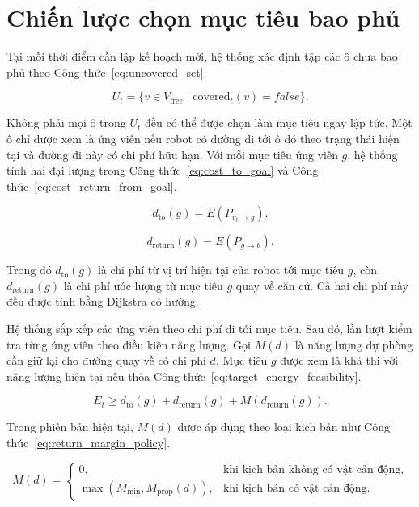 \documentclass[../DoAn.tex]{subfiles}
\begin{document}
\section{Chiến lược chọn mục tiêu bao phủ}

Tại mỗi thời điểm cần lập kế hoạch mới, hệ thống xác định tập các ô chưa bao phủ theo Công thức~\ref{eq:uncovered_set}.

\begin{equation}
    U_t=\{v\in V_{\text{free}} \mid \text{covered}_t(v)=false\}.
    \label{eq:uncovered_set}
\end{equation}

Không phải mọi ô trong $U_t$ đều có thể được chọn làm mục tiêu ngay lập tức. Một ô chỉ được xem là ứng viên nếu robot có đường đi tới ô đó theo trạng thái hiện tại và đường đi này có chi phí hữu hạn. Với mỗi mục tiêu ứng viên $g$, hệ thống tính hai đại lượng trong Công thức~\ref{eq:cost_to_goal} và Công thức~\ref{eq:cost_return_from_goal}.

\begin{equation}
    d_{\text{to}}(g)=E(P_{v_t\rightarrow g}).
    \label{eq:cost_to_goal}
\end{equation}

\begin{equation}
    d_{\text{return}}(g)=E(P_{g\rightarrow b}).
    \label{eq:cost_return_from_goal}
\end{equation}

Trong đó $d_{\text{to}}(g)$ là chi phí từ vị trí hiện tại của robot tới mục tiêu $g$, còn $d_{\text{return}}(g)$ là chi phí ước lượng từ mục tiêu $g$ quay về căn cứ. Cả hai chi phí này đều được tính bằng Dijkstra có hướng.

Hệ thống sắp xếp các ứng viên theo chi phí đi tới mục tiêu. Sau đó, lần lượt kiểm tra từng ứng viên theo điều kiện năng lượng. Gọi $M(d)$ là năng lượng dự phòng cần giữ lại cho đường quay về có chi phí $d$. Mục tiêu $g$ được xem là khả thi với năng lượng hiện tại nếu thỏa Công thức~\ref{eq:target_energy_feasibility}.

\begin{equation}
    E_t \ge d_{\text{to}}(g)+d_{\text{return}}(g)+M(d_{\text{return}}(g)).
    \label{eq:target_energy_feasibility}
\end{equation}

Trong phiên bản hiện tại, $M(d)$ được áp dụng theo loại kịch bản như Công thức~\ref{eq:return_margin_policy}.

\begin{equation}
M(d)=
\begin{cases}
0, & \text{khi kịch bản không có vật cản động},\\
\max\left(M_{\min},M_{\text{prop}}(d)\right), & \text{khi kịch bản có vật cản động}.
\end{cases}
\label{eq:return_margin_policy}
\end{equation}
\end{document}
